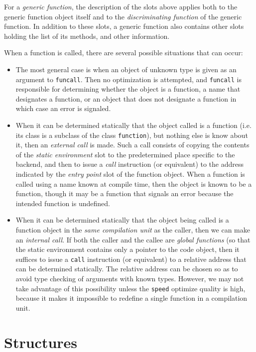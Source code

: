 For a \emph{generic function}, the description of the slots above
applies both to the generic function object itself and to the
\emph{discriminating function} of the generic function.  In addition
to these slots, a generic function also contains other slots holding
the list of its methods, and other information.

When a function is called, there are several possible situations that
can occur:

\begin{itemize}
\item The most general case is when an object of unknown type is given
  as an argument to \texttt{funcall}.  Then no optimization is
  attempted, and \texttt{funcall} is responsible for determining
  whether the object is a function, a name that designates a function,
  or an object that does not designate a function in which case an error is
  signaled.
\item When it can be determined statically that the object called is a
  function (i.e. its class is a subclass of the class
  \texttt{function}), but nothing else is know about it, then an
  \emph{external call} is made.  Such a call consists of copying the
  contents of the \emph{static environment} slot to the predetermined
  place specific to the backend, and then to issue a \emph{call}
  instruction (or equivalent) to the address indicated by the
  \emph{entry point} slot of the function object.  When a function is
  called using a name known at compile time, then the object is known
  to be a function, though it may be a function that signals an error
  because the intended function is undefined.
\item When it can be determined statically that the object being
  called is a function object in the \emph{same compilation unit} as
  the caller, then we can make an \emph{internal call}.  If both the
  caller and the callee are \emph{global functions} (so that the
  static environment contains only a pointer to the code object, then
  it suffices to issue a \texttt{call} instruction (or equivalent) to
  a relative address that can be determined statically. The relative
  address can be chosen so as to avoid type checking of arguments with
  known types.  However, we may not take advantage of this possibility
  unless the \texttt{speed} optimize quality is high, because it makes
  it impossible to redefine a single function in a compilation unit.
\end{itemize}

\section{Structures}

